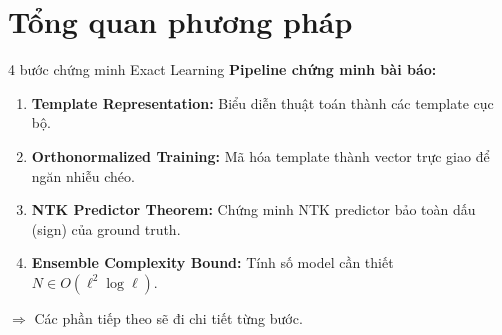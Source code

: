 \section{Tổng quan phương pháp}

\begin{frame}{4 bước chứng minh Exact Learning}
  \textbf{Pipeline chứng minh bài báo:}
  
  \vspace{0.4cm}
  \begin{enumerate}
    \item \textbf{Template Representation:} Biểu diễn thuật toán thành các template cục bộ.
    \item \textbf{Orthonormalized Training:} Mã hóa template thành vector trực giao để ngăn nhiễu chéo.
    \item \textbf{NTK Predictor Theorem:} Chứng minh NTK predictor bảo toàn dấu (sign) của ground truth.
    \item \textbf{Ensemble Complexity Bound:} Tính số model cần thiết $N \in O(\ell^2 \log \ell)$.
  \end{enumerate}
  
  \vspace{0.3cm}
  $\Rightarrow$ Các phần tiếp theo sẽ đi chi tiết từng bước.
\end{frame}
